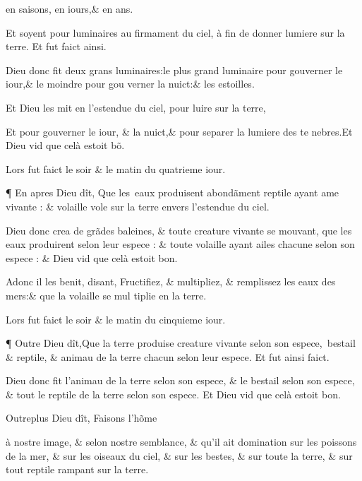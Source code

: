 \documentclass[twocolumn,paper=a4,pagesize=pdftex,12pt,headinclude=on]{scrbook}
\newcounter{verse}
\newcommand{\bverse}{%
  \addtocounter{verse}{1}
  \theverse\quad
}
\begin{document}
\pagebreak

\footnotemarkmain{} en saisons,
\footnotemarkmain{}en iours,\& en ans.

\bverse Et soyent pour luminaires au firma\-ment
du ciel, à fin de donner lumiere
sur la terre. Et fut faict ainsi.

\bverse Dieu donc fit deux grans luminai\-res:le
 plus grand luminaire pour
\footnotemarkmain{} gouverner le iour,\& le moindre
pour gou \linebreak
verner la nuict:\& les estoilles.

\bverse Et Dieu les mit en l'estendue du ciel,
pour luire sur la terre,

\bverse Et pour gouverner le iour, \& la
nuict,\& pour separer la lumiere des te \linebreak
nebres.Et Dieu vid que celà estoit b\~o.

\bverse Lors fut faict le soir \& le matin du
quatrieme iour.

\bverse ¶ En apres Dieu dît, Que les~eaux
produisent abond\~ament
\footnotemarkmain{}reptile ayant ame
vivante : \& volaille vole sur la ter\-re
envers l'estendue du ciel.

\bverse Dieu donc
\footnotemarkmain{}crea de gr\~ades baleines,
\& toute creature vivante se mouvant,
que les eaux produirent selon leur es\-pece :
\& toute volaille ayant ailes chacune selon son espece : 
\& Dieu vid \linebreak
 que celà estoit bon.

\bverse Adonc \footnotemarkmain{}il les benit, disant, Fructi\-fiez,
\& multipliez, \& remplissez les
eaux des mers:\& que la volaille se mul \linebreak
tiplie en la terre.

\bverse Lors fut faict le soir \& le matin du
cinquieme iour.

\bverse ¶ Outre Dieu dît,Que la terre produise
creature vivante selon son espe\-ce,~bestail
 \& reptile, \& animau de la
terre chacun selon leur espece. Et fut
ainsi faict.

\bverse Dieu donc fit l'animau de la terre
selon son espece, \& le bestail selon son
espece, \& tout le reptile de la terre se\-lon
son espece. Et Dieu vid que celà
estoit bon.

\bverse Outreplus Dieu dît,
\footnotemarkmain{}Faisons
\footnotemarkmain{}l'h\~o\-me
\addtocounter{footnotemain}{1}%
à \footnotemarkverse{}\footnotemarkmain{} nostre image,
\& selon nostre
semblance, \& qu'il ait domination sur
les poissons de la mer, \& sur les oi\-seaux
du ciel, \& sur les bestes, \& sur
toute la terre, \& sur tout reptile ram\-pant
sur la terre.
\addtocounter{footnotemain}{1}%
\end{document}
